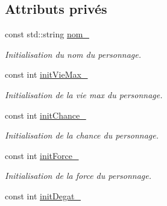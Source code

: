 \subsection*{Attributs privés}
\begin{DoxyCompactItemize}
\item 
\hypertarget{class_personnage_a30b730a6908d2a27a3313a33fca2f2d0}{const std\-::string \hyperlink{class_personnage_a30b730a6908d2a27a3313a33fca2f2d0}{nom\-\_\-}}\label{class_personnage_a30b730a6908d2a27a3313a33fca2f2d0}

\begin{DoxyCompactList}\small\item\em Initialisation du nom du personnage. \end{DoxyCompactList}\item 
\hypertarget{class_personnage_a08047c5570ab1a943e5222d468bc04e4}{const int \hyperlink{class_personnage_a08047c5570ab1a943e5222d468bc04e4}{init\-Vie\-Max\-\_\-}}\label{class_personnage_a08047c5570ab1a943e5222d468bc04e4}

\begin{DoxyCompactList}\small\item\em Initialisation de la vie max du personnage. \end{DoxyCompactList}\item 
\hypertarget{class_personnage_adbcab4e3e65e3413733c785c446ac3de}{const int \hyperlink{class_personnage_adbcab4e3e65e3413733c785c446ac3de}{init\-Chance\-\_\-}}\label{class_personnage_adbcab4e3e65e3413733c785c446ac3de}

\begin{DoxyCompactList}\small\item\em Initialisation de la chance du personnage. \end{DoxyCompactList}\item 
\hypertarget{class_personnage_a6e27cb04f9c27188eca2dcf85e52c46b}{const int \hyperlink{class_personnage_a6e27cb04f9c27188eca2dcf85e52c46b}{init\-Force\-\_\-}}\label{class_personnage_a6e27cb04f9c27188eca2dcf85e52c46b}

\begin{DoxyCompactList}\small\item\em Initialisation de la force du personnage. \end{DoxyCompactList}\item 
\hypertarget{class_personnage_a588652816fc2e5646dea893786ebe1a2}{const int \hyperlink{class_personnage_a588652816fc2e5646dea893786ebe1a2}{init\-Degat\-\_\-}}\label{class_personnage_a588652816fc2e5646dea893786ebe1a2}


\end{DoxyCompactItemize}
